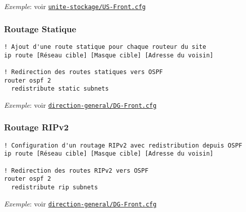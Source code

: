 \documentclass{article}
\newcommand{\seefile}[1]{
  \begin{center}
  \begin{minipage}{0.9\textwidth}
    \emph{Exemple}: voir \texttt{\href{https://github.com/EpicKiwi/Wide-Network-Project-Cesi-A4/blob/master/network/#1}{#1}}
  \end{minipage}
  \end{center}
}
\begin{document}
\seefile{unite-stockage/US-Front.cfg}

\subsubsection{Routage Statique}

\begin{lstlisting}[caption=Configuration d'un routeur "Front" avec routage statique]
! Ajout d'une route statique pour chaque routeur du site
ip route [Réseau cible] [Masque cible] [Adresse du voisin]

! Redirection des routes statiques vers OSPF
router ospf 2
  redistribute static subnets
\end{lstlisting}

\seefile{direction-general/DG-Front.cfg}

\subsubsection{Routage RIPv2}

\begin{lstlisting}[caption=Configuration d'un routeur "Front" avec RIPv2]
! Configuration d'un routage RIPv2 avec redistribution depuis OSPF
ip route [Réseau cible] [Masque cible] [Adresse du voisin]

! Redirection des routes RIPv2 vers OSPF
router ospf 2
  redistribute rip subnets
\end{lstlisting}

\seefile{direction-general/DG-Front.cfg}
\end{document}
